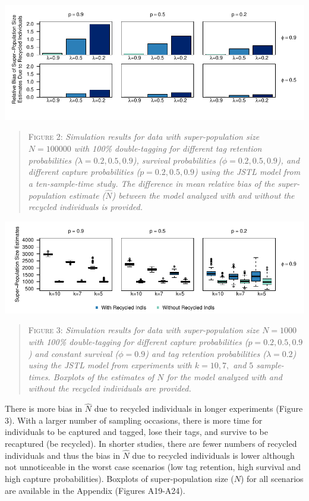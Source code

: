 \documentclass[]{article}
\begin{document}
\includegraphics{RecycledPaper_files/figure-latex/Figure2_N-1.pdf}

\begin{quote}
\textsc{Figure 2:}
\textsl{Simulation results for data with super-population size $N=100 000$ with 100\% double-tagging for different tag retention probabilities ($\lambda=0.2,0.5,0.9$), survival probabilities ($\phi=0.2,0.5,0.9$), and different capture probabilities ($p=0.2,0.5,0.9$) using the JSTL model from a ten-sample-time study. The difference in mean relative bias of the super-population estimate ($\hat{N}$) between the model analyzed with and without the recycled individuals is provided.}
\end{quote}

\includegraphics{RecycledPaper_files/figure-latex/Figure3_N_k-1.pdf}

\begin{quote}
\textsc{Figure 3:}
\textsl{Simulation results for data with super-population size $N=1000$ with 100\% double-tagging for different capture probabilities ($p=0.2,0.5,0.9$) and constant survival ($\phi=0.9$) and tag retention probabilities ($\lambda=0.2$) using the JSTL model from experiments with $k=10, 7,$ and $5$ sample-times. Boxplots of the estimates of $N$ for the model analyzed with and without the recycled individuals are provided.}
\end{quote}

There is more bias in \(\hat{N}\) due to recycled individuals in longer
experiments (Figure 3). With a larger number of sampling occasions,
there is more time for individuals to be captured and tagged, lose their
tags, and survive to be recaptured (be recycled). In shorter studies,
there are fewer numbers of recycled individuals and thus the bias in
\(\hat{N}\) due to recycled individuals is lower although not
unnoticeable in the worst case scenarios (low tag retention, high
survival and high capture probabilities). Boxplots of super-population
size (\(N\)) for all scenarios are available in the Appendix (Figures
A19-A24).
\end{document}
